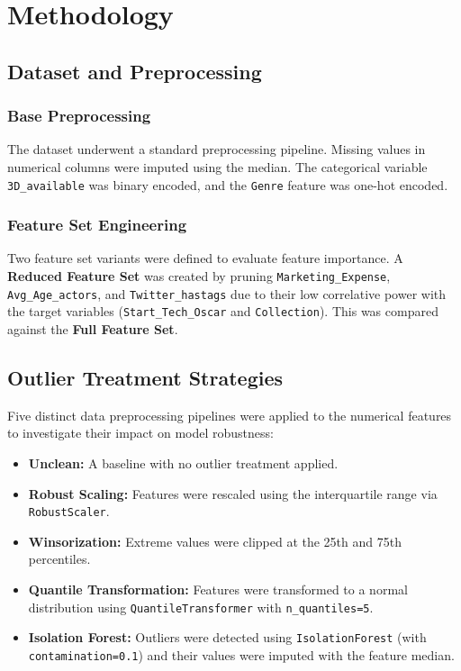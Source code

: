 \documentclass[11pt]{article}
\begin{document}
\section{Methodology}

\subsection{Dataset and Preprocessing}

\subsubsection{Base Preprocessing}
The dataset underwent a standard preprocessing pipeline. Missing values in numerical columns were imputed using the median. The categorical variable \texttt{3D\_available} was binary encoded, and the \texttt{Genre} feature was one-hot encoded.

\subsubsection{Feature Set Engineering}
Two feature set variants were defined to evaluate feature importance. A \textbf{Reduced Feature Set} was created by pruning \texttt{Marketing\_Expense}, \texttt{Avg\_Age\_actors}, and \texttt{Twitter\_hastags} due to their low correlative power with the target variables (\texttt{Start\_Tech\_Oscar} and \texttt{Collection}). This was compared against the \textbf{Full Feature Set}.

\subsection{Outlier Treatment Strategies}
Five distinct data preprocessing pipelines were applied to the numerical features to investigate their impact on model robustness:

\begin{itemize}[leftmargin=*,nosep]
    \item \textbf{Unclean:} A baseline with no outlier treatment applied.
    \item \textbf{Robust Scaling:} Features were rescaled using the interquartile range via \texttt{RobustScaler}.
    \item \textbf{Winsorization:} Extreme values were clipped at the 25th and 75th percentiles.
    \item \textbf{Quantile Transformation:} Features were transformed to a normal distribution using \texttt{QuantileTransformer} with \texttt{n\_quantiles=5}.
    \item \textbf{Isolation Forest:} Outliers were detected using \texttt{IsolationForest} (with \texttt{contamination=0.1}) and their values were imputed with the feature median.
\end{itemize}
\end{document}
